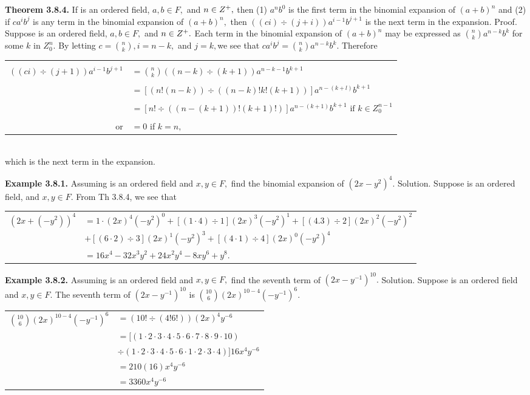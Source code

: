 \begin{large}
\textbf{Theorem 3.8.4.} If \of is an ordered field, $a,b\in F,$ and $n\in Z^{+},$ then (1) $a^{n}b^{0}$ is the first term in the binomial expansion of $(a+b)^n$ and
(2) if $ca^{i}b^{j}$ is any term in the binomial expansion of $(a+b)^{n},$ then $((ci) \div (j+i))a^{i-1}b^{j+1}$ is the next term in the expansion.\nl
 Proof. Suppose \of is an ordered field, $a,b\in F,$ and $n\in Z^{+}.$ Each term in the binomial expansion of $(a+b)^{n}$ may be expressed as $\binom{n}{k}a^{n-k}b^{k}$ for some $k$ in $Z_{0}^{n}.$ By letting $c=  \binom{n}{k}, i = n - k,$ and $j = k,$we see that\nl 
 $ca^{i}b^{j}= \binom{n}{k}a^{n-k}b^{k}.$  Therefore\nl
\begin{tabular}{r l}
&\\
$((ci) \div (j+1))a^{i-1}b^{j+1}$&$=\binom{n}{k} ((n-k) \div (k+1))a^{n-k-1}b^{k+1}$\\
&\\
& $= [(n!(n-k))\div ((n-k)!k!(k+1))]a^{n-(k+l)}b^{k+1}$\\
&\\
& $=[n! \div((n-(k+1))!(k+1)!)]a^{n-(k+1)}b^{k+1} \text{~if~} k\in Z_{0}^{n-1}$\\
&\\
or&$= 0$ if $k = n,$ \\
\end{tabular}\\
 which is the next term in the expansion. \nl

\textbf{Example 3.8.1.} Assuming \of is an ordered field and $x,y\in F,$ find the binomial expansion of
$(2x-y^{2})^{4}.$  \nl
 Solution. Suppose \of is an ordered field, and $x,y\in F.$ From Th 3.8.4, we see that \nl
\begin{tabular}{r l}
$(2x+(-y^{2}))^{4}$ & $=1\cdot(2x)^{4}(-y^{2})^{0} + [(1\cdot 4)\div 1](2x)^{3}(-y^{2})^{1}  + [(4.3)\div 2] (2x)^{2} (-y^{2})^{2}$\\
&$+[(6\cdot 2)\div 3](2x)^{1} (-y^{2})^{3} + [(4\cdot 1)\div 4] (2x)^{0}(-y^{2})^{4} $\\
&$=16x^{4} - 32x^{3}y^{2} + 24x^{2}y^{4} -8xy^{6} + y^{8}.$\\
\end{tabular}\nl

\textbf{Example 3.8.2.} Assuming \of is an ordered field and $x,y\in F,$ find the seventh term of $(2x - y^{-1})^{10}.$\nl
 Solution. Suppose \of is an ordered field and $x,y\in F.$ The seventh term of $(2x - y^{-1})^{10}$ is
 $\binom{10}{6}(2x)^{10-4}(-y^{-1})^{6}.$\nl
\begin{tabular}{r l}
$\binom{10}{6}(2x)^{10-4}(-y^{-1})^{6}$&$= (10!\div (4!6!))(2x)^{4}y^{-6}$\\
&$= [(1\cdot 2\cdot 3\cdot 4\cdot 5\cdot 6\cdot 7\cdot 8\cdot 9\cdot 10)$\\
&$ \div  (1\cdot 2\cdot 3\cdot 4\cdot 5\cdot 6\cdot 1\cdot 2\cdot 3\cdot 4)] 16x^{4}y^{-6}$\\
&$=210(16)x^{4}y^{-6}$\\
&$=3360x^{4}y^{-6}$\\
\end{tabular}\\


\end{large}
